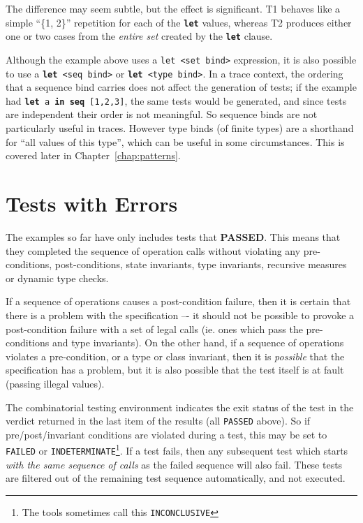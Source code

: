 \documentclass{overturerepchap}
\begin{document}
The difference may seem subtle, but the effect is significant. T1 behaves like a
simple ``\{1, 2\}'' repetition for each of the \texttt{\textbf{let}} values, whereas T2
produces either one or two cases from the \emph{entire set} created by the \texttt{\textbf{let}}
clause.

Although the example above uses a \texttt{let <set bind>} expression, it is also
possible to use a \texttt{\textbf{let} <seq bind>} or \texttt{\textbf{let} <type bind>}. In a
trace context, the ordering that a sequence bind carries does not affect the
generation of tests; if the example had \texttt{\textbf{let} a \textbf{in seq} [1,2,3]}, the
same tests would be generated, and since tests are independent their order is not
meaningful. So sequence binds are not particularly useful in traces. However
type binds (of finite types) are a shorthand for ``all values of this type'',
which can be useful in some circumstances. This is covered later in Chapter~\ref{chap:patterns}.

\section{Tests with Errors}

The examples so far have only includes tests that \textbf{PASSED}. This means that they
completed the sequence of operation calls without violating any pre-conditions,
post-conditions, state invariants, type invariants, recursive measures or dynamic
type checks.

If a sequence of operations causes a post-condition failure, then it
is certain that there is a problem with the specification –- it should not be
possible to provoke a post-condition failure with a set of legal calls (ie. ones
which pass the pre-conditions and type invariants). On the other hand, if a 
sequence of operations violates a pre-condition, or a type or class invariant, 
then it is \emph{possible} that the specification has a problem, but it is also 
possible that the test itself is at fault (passing illegal values).

The combinatorial testing environment indicates the exit status of the test  in
the verdict returned in the last item of the results (all \texttt{PASSED} above). So if 
pre/post/invariant conditions are violated during a test, this may be set to 
\texttt{FAILED} or \texttt{INDETERMINATE}\footnote{The tools sometimes call this \texttt{INCONCLUSIVE}}. If
a test fails, then any subsequent test which starts \emph{with the same
sequence of calls} as the failed sequence will also fail. These tests are
filtered out of the remaining test sequence automatically, and not executed.
\end{document}
